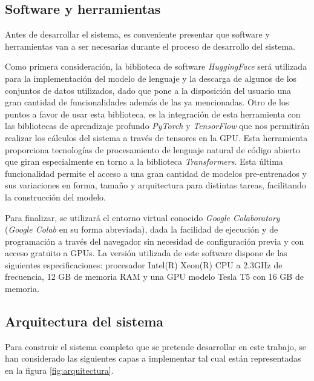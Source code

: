 \subsection{Software y herramientas}

Antes de desarrollar el sistema, es conveniente presentar que software y herramientas van a ser necesarias durante el proceso de desarrollo del sistema.

Como primera consideración, la biblioteca de software \textit{HuggingFace} será utilizada para la implementación del modelo de lenguaje y la descarga de algunos de los conjuntos de datos utilizados, dado que pone a la disposición del usuario una gran cantidad de funcionalidades además de las ya mencionadas. Otro de los puntos a favor de usar esta biblioteca, es la integración de esta herramienta con las bibliotecas de aprendizaje profundo \textit{PyTorch} y \textit{TensorFlow} que nos permitirán realizar los cálculos del sistema a través de tensores en la GPU. Esta herramienta proporciona tecnologías de procesamiento de lenguaje natural de código abierto que giran especialmente en torno a la biblioteca \textit{Transformers}. Esta última funcionalidad permite el acceso a una gran cantidad de modelos pre-entrenados y sus variaciones en forma, tamaño y arquitectura para distintas tareas, facilitando la construcción del modelo.

Para finalizar, se utilizará el entorno virtual conocido \textit{Google Colaboratory} (\textit{Google Colab} en su forma abreviada), dada la facilidad de ejecución y de programación a través del navegador sin necesidad de configuración previa y
con acceso gratuito a GPUs. La versión utilizada de este software dispone de las siguientes especificaciones: procesador Intel(R) Xeon(R) CPU a 2.3GHz de frecuencia, 12 GB de memoria RAM y una GPU modelo Tesla T5 con 16 GB de memoria.



\subsection{Arquitectura del sistema}
Para construir el sistema completo que se pretende desarrollar en este trabajo, se han considerado las siguientes capas a implementar tal cual están representadas en la figura \ref{fig:arquitectura}.

